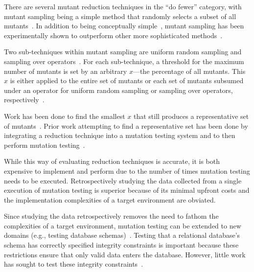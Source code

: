

There are several mutant reduction techniques in the ``do fewer'' category, with mutant sampling being a simple method
that randomly selects a subset of all mutants~\cite{wong1995reducing}. In addition to being conceptually
simple~\cite{gopinath2015mutation}, mutant sampling has been experimentally shown to outperform other more sophisticated
methods~\cite{zhang2010operator}.


Two sub-techniques within mutant sampling are uniform random sampling and sampling over
operators~\cite{gopinath2015mutation, gopinath2015empirical}.  For each sub-technique, a threshold for the maximum
number of mutants is set by an arbitrary $x$---the percentage of all mutants.  This $x$ is either applied to the entire
set of mutants or each set of mutants subsumed under an operator for uniform random sampling or sampling over operators,
respectively~\cite{gopinath2015mutation, gopinath2015empirical}.

Work has been done to find the smallest $x$ that still produces
a representative set of mutants~\cite{jia2011analysis, mathur1994empirical}. Prior work
attempting to find a representative set has been done by integrating a reduction technique into
a mutation testing system and to then perform mutation testing~\cite{demillo1988extended, king1991fortran}.

While this way of evaluating reduction techniques is accurate, it is both
expensive to implement and perform due to the number of times mutation testing
needs to be executed. Retrospectively studying the data
collected from a single execution of mutation testing is superior
because of its minimal upfront costs and the implementation complexities of
a target environment are obviated.

Since studying the data retrospectively removes the need to fathom the complexities of a target environment,
mutation testing can be extended to new domains (e.g., testing database schemas)~\cite{mcminn2016virtual, mcminn2015effectiveness, wright2013efficient}.
Testing that a relational database's schema has correctly specified integrity constraints is important
because these restrictions ensure that only valid data enters the database. However, little work has
sought to test these integrity constraints~\cite{mcminn2016virtual}.

